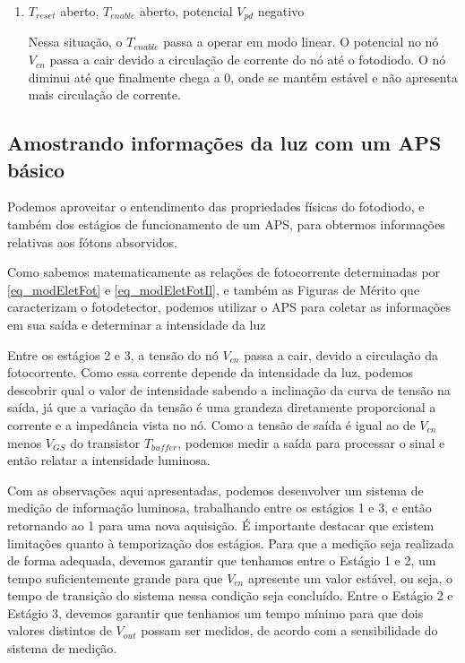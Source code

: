 \begin{enumerate}
\item \emph{$T_{reset}$} aberto, \emph{$T_{enable}$} aberto, potencial \emph{$V_{pd}$} negativo

Nessa situação, o $T_{enable}$ passa a operar em modo linear. O potencial no n\'o $V_{cn}$ passa a cair devido a circulação de corrente do n\'o at\'e o fotodiodo. O nó diminui at\'e que finalmente chega a 0, onde se mant\'em estável e não apresenta mais circula{\c c}\~ao de corrente.

\end{enumerate}

\subsection{Amostrando informações da luz com um APS básico}

Podemos aproveitar o entendimento das propriedades f\'isicas do fotodiodo, e tamb\'em dos est\'agios de funcionamento de um APS, para obtermos informações relativas aos f\'otons absorvidos.

Como sabemos matematicamente as relações de fotocorrente determinadas por \autoref{eq_modEletFot} e \autoref{eq_modEletFotIl}, e tamb\'em as Figuras de M\'erito que caracterizam o fotodetector, podemos utilizar o APS para coletar as informações em sua sa\'ida e determinar a intensidade da luz

Entre os est\'agios 2 e 3, a tens\~ao do n\'o $V_{cn}$ passa a cair, devido a circula{\c c}\~ao da fotocorrente. Como essa corrente depende da intensidade da luz, podemos descobrir qual o valor de intensidade sabendo a inclina{\c c}\~ao da curva de tens\~ao na sa\'ida, j\'a que a varia{\c c}\~ao da tens\~ao \'e uma grandeza diretamente proporcional a corrente e a imped\^ancia vista no n\'o. Como a tens\~ao de sa\'ida \'e igual ao de $V_{cn}$ menos $V_{GS}$ do transistor $T_{buffer}$, podemos medir a sa\'ida para processar o sinal e ent\~ao relatar a intensidade luminosa.

Com as observa{\c c}\~oes aqui apresentadas, podemos desenvolver um sistema de medi{\c c}\~ao de informa{\c c}\~ao luminosa, trabalhando entre os est\'agios 1 e 3, e ent\~ao retornando ao 1 para uma nova aquisi{\c c}\~ao. \'E importante destacar que existem limitações quanto \`a temporiza{\c c}\~ao dos est\'agios. Para que a medi{\c c}\~ao seja realizada de forma adequada, devemos garantir que tenhamos entre o Est\'agio 1 e 2, um tempo suficientemente grande para que $V_{cn}$ apresente um valor estável, ou seja, o tempo de transi{\c c}\~ao do sistema nessa condi{\c c}\~ao seja conclu\'ido. Entre o Est\'agio 2 e Est\'agio 3, devemos garantir que tenhamos um tempo mínimo para que dois valores distintos de $V_{out}$ possam ser medidos, de acordo com a sensibilidade do sistema de medi{\c c}\~ao.

